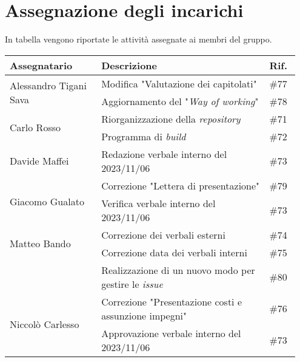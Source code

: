 \section{Assegnazione degli incarichi}
In tabella vengono riportate le attività assegnate ai membri del gruppo.
\begin{center}
    {
    \renewcommand{\arraystretch}{1.5}
    \begin{tabular}{p{0.30\linewidth}|p{0.55\linewidth}|p{0.10\linewidth}}
		\textbf{Assegnatario}   		&   \textbf{Descrizione}   & \textbf{Rif.}     \\
		\hline
		\multirow{2}{*}{Alessandro Tigani Sava}  		&	Modifica "Valutazione dei capitolati"		& \#77 	\\
		\cline{2-3}
										&   Aggiornamento del "\textit{Way of working}" 			& \#78  \\  
		\hline
		\multirow{2}{*}{Carlo Rosso}	&	Riorganizzazione della \textit{repository}				& \#71 	\\
		\cline{2-3}
										&	Programma di \textit{build}								& \#72 	\\
		\hline
		Davide Maffei					&   Redazione verbale interno del 2023/11/06				& \#73 	\\
		\hline
		\multirow{2}{*}{Giacomo Gualato}					
										&	Correzione "Lettera di presentazione" 					& \#79 	\\
        \cline{2-3}
										&   Verifica verbale interno del 2023/11/06				& \#73 \\
		\hline
		\multirow{2}{*}{Matteo Bando}	&	Correzione dei verbali esterni 						& \#74 	\\
		\cline{2-3}
										&	Correzione data dei verbali interni					& \#75 	\\
		\cline{2-3}
										&	Realizzazione di un nuovo modo per gestire le \textit{issue}				& \#80 	\\
		\hline
		\multirow{2}{*}{Niccolò Carlesso}				
										&	Correzione "Presentazione costi e assunzione impegni"	& \#76 	\\
        \cline{2-3}
										&   Approvazione verbale interno del 2023/11/06				& \#73
    \end{tabular}
    }
\end{center}
